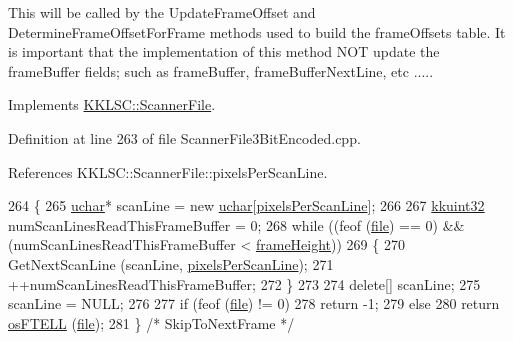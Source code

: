This will be called by the \textquotesingle{}Update\+Frame\+Offset\textquotesingle{} and \textquotesingle{}Determine\+Frame\+Offset\+For\+Frame\textquotesingle{} methods used to build the \textquotesingle{}frame\+Offsets\textquotesingle{} table. It is important that the implementation of this method N\+OT update the frame\+Buffer fields; such as \textquotesingle{}frame\+Buffer\textquotesingle{}, \textquotesingle{}frame\+Buffer\+Next\+Line\textquotesingle{}, etc ..... 

Implements \hyperlink{class_k_k_l_s_c_1_1_scanner_file_a1797e4ba35b312c53da2c453f1303f35}{K\+K\+L\+S\+C\+::\+Scanner\+File}.



Definition at line 263 of file Scanner\+File3\+Bit\+Encoded.\+cpp.



References K\+K\+L\+S\+C\+::\+Scanner\+File\+::pixels\+Per\+Scan\+Line.


\begin{DoxyCode}
264 \{
265   \hyperlink{namespace_k_k_b_ace9969169bf514f9ee6185186949cdf7}{uchar}*  scanLine = \textcolor{keyword}{new} \hyperlink{namespace_k_k_b_ace9969169bf514f9ee6185186949cdf7}{uchar}[\hyperlink{class_k_k_l_s_c_1_1_scanner_file_a07b4ac6b33c35ad0148c7a1422c73cfe}{pixelsPerScanLine}];
266 
267   \hyperlink{namespace_k_k_b_af8d832f05c54994a1cce25bd5743e19a}{kkuint32}  numScanLinesReadThisFrameBuffer = 0;
268   \textcolor{keywordflow}{while}  ((feof (\hyperlink{class_k_k_l_s_c_1_1_scanner_file_a26db15f7823ce67b1621da17468ec807}{file}) == 0)  &&  (numScanLinesReadThisFrameBuffer < 
      \hyperlink{class_k_k_l_s_c_1_1_scanner_file_a5598193d137fb79782cc1967ec830625}{frameHeight}))
269   \{
270     GetNextScanLine (scanLine, \hyperlink{class_k_k_l_s_c_1_1_scanner_file_a07b4ac6b33c35ad0148c7a1422c73cfe}{pixelsPerScanLine});
271     ++numScanLinesReadThisFrameBuffer;
272   \}
273 
274   \textcolor{keyword}{delete}[]  scanLine;
275   scanLine = NULL;
276 
277   \textcolor{keywordflow}{if}  (feof (\hyperlink{class_k_k_l_s_c_1_1_scanner_file_a26db15f7823ce67b1621da17468ec807}{file}) != 0)
278     \textcolor{keywordflow}{return} -1;
279   \textcolor{keywordflow}{else}
280     \textcolor{keywordflow}{return} \hyperlink{namespace_k_k_b_a2cc11a5ae09d10d69ad751b549e5d94e}{osFTELL} (\hyperlink{class_k_k_l_s_c_1_1_scanner_file_a26db15f7823ce67b1621da17468ec807}{file});
281 \}  \textcolor{comment}{/* SkipToNextFrame */}
\end{DoxyCode}
